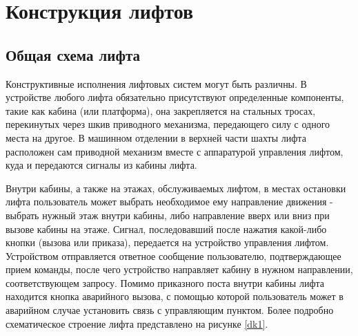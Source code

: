 \section{Конструкция лифтов}

	\subsection{Общая схема лифта}
		Конструктивные исполнения лифтовых систем могут быть различны.
			В устройстве любого лифта обязательно присутствуют определенные компоненты,
			такие как кабина (или платформа), она закрепляется на стальных тросах,
			перекинутых через шкив приводного механизма, передающего силу с одного места на другое.
			В машинном отделении в верхней части шахты лифта расположен сам приводной механизм
			вместе с аппаратурой управления лифтом, куда и передаются сигналы из кабины лифта. 

		Внутри кабины, а также на этажах, обслуживаемых лифтом, в местах остановки лифта
			пользователь может выбрать необходимое ему направление движения - выбрать нужный
			этаж внутри кабины, либо направление вверх или вниз при вызове кабины на этаже.
			Сигнал, последовавший после нажатия какой-либо кнопки (вызова или приказа),
			передается на устройство управления лифтом. Устройством отправляется  ответное
			сообщение пользователю, подтверждающее прием команды, после чего устройство направляет
			кабину в нужном направлении, соответствующем запросу. Помимо приказного поста внутри
			кабины лифта находится кнопка аварийного вызова, с помощью которой пользователь может
			в аварийном случае установить связь с управляющим пунктом.
			Более подробно схематическое строение лифта представлено на рисунке \ref{dk1}.

